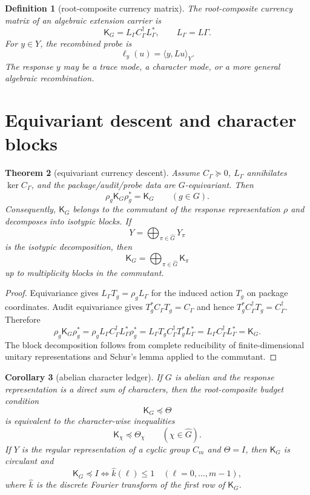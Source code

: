\documentclass[11pt]{article}
\newtheorem{theorem}{Theorem}[section]
\newtheorem{definition}[theorem]{Definition}
\newtheorem{corollary}[theorem]{Corollary}
\newcommand{\K}{\mathsf K}
\begin{document}
\begin{definition}[root-composite currency matrix]
The root-composite currency matrix of an algebraic extension carrier is
\[
  \K_{G}=L_\Gamma C_\Gamma^\dagger L_\Gamma^*,
  \qquad L_\Gamma=L\Gamma.
\]
For $y\in Y$, the recombined probe is
\[
  \ell_y(u)=\langle y,Lu\rangle_Y.
\]
The response $y$ may be a trace mode, a character mode, or a more general algebraic recombination.
\end{definition}

\section{Equivariant descent and character blocks}

\begin{theorem}[equivariant currency descent]
Assume $C_\Gamma\succeq0$, $L_\Gamma$ annihilates $\ker C_\Gamma$, and the package/audit/probe data are $G$-equivariant.  Then
\[
  \rho_g \K_G \rho_g^*=\K_G
  \qquad(g\in G).
\]
Consequently, $\K_G$ belongs to the commutant of the response representation $\rho$ and decomposes into isotypic blocks.  If
\[
  Y=\bigoplus_{\pi\in\widehat G}Y_\pi
\]
is the isotypic decomposition, then
\[
  \K_G=\bigoplus_{\pi\in\widehat G}\K_\pi
\]
up to multiplicity blocks in the commutant.
\end{theorem}

\begin{proof}
Equivariance gives $L_\Gamma T_g=\rho_gL_\Gamma$ for the induced action $T_g$ on package coordinates.  Audit equivariance gives $T_g^*C_\Gamma T_g=C_\Gamma$ and hence $T_g^*C_\Gamma^\dagger T_g=C_\Gamma^\dagger$.  Therefore
\[
  \rho_g\K_G\rho_g^*
  =\rho_g L_\Gamma C_\Gamma^\dagger L_\Gamma^*\rho_g^*
  =L_\Gamma T_g C_\Gamma^\dagger T_g^* L_\Gamma^*
  =L_\Gamma C_\Gamma^\dagger L_\Gamma^*
  =\K_G .
\]
The block decomposition follows from complete reducibility of finite-dimensional unitary representations and Schur's lemma applied to the commutant.
\end{proof}

\begin{corollary}[abelian character ledger]
If $G$ is abelian and the response representation is a direct sum of characters, then the root-composite budget condition
\[
  \K_G\preceq\Theta
\]
is equivalent to the character-wise inequalities
\[
  \K_\chi\preceq\Theta_\chi
  \qquad(\chi\in\widehat G).
\]
If $Y$ is the regular representation of a cyclic group $C_m$ and $\Theta=I$, then $\K_G$ is circulant and
\[
  \K_G\preceq I
  \iff
  \widehat k(\ell)\le1\quad(\ell=0,\dots,m-1),
\]
where $\widehat k$ is the discrete Fourier transform of the first row of $\K_G$.
\end{corollary}
\end{document}
